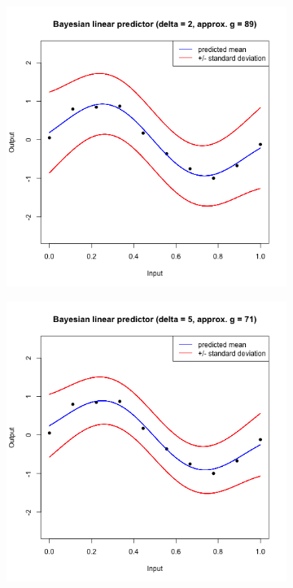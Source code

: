 \documentclass[a4paper, 11pt]{article}
\begin{document}
\begin{figure}[H]
\centering
\begin{subfigure}{.5\textwidth}
  \centering
  \includegraphics[width=1\linewidth]{ps3F_plot5.png}
\end{subfigure}%
\begin{subfigure}{.5\textwidth}
  \centering
  \includegraphics[width=1\linewidth]{ps3F_plot7.png}
\end{subfigure}
\end{figure}
\end{document}
